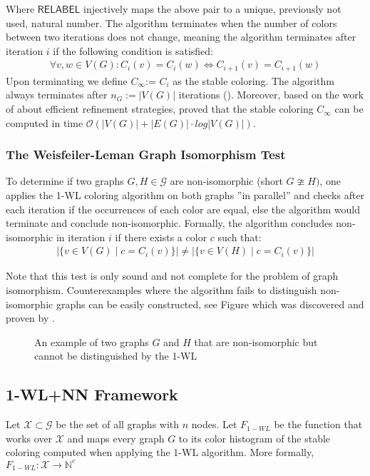 \documentclass[11pt, dvipsnames, DIV=12]{scrreprt}
\theoremstyle{definition}
\begin{document}
\noindent Where $\textsf{RELABEL}$ injectively maps the above pair to a unique, previously not used, natural number. The algorithm terminates when the number of colors between two iterations does not change, meaning the algorithm terminates after iteration $i$ if the following condition is satisfied:
\begin{align}
\forall v,w \in V(G):  C_i(v) = C_i(w) \iff C_{i+1}(v) = C_{i+1}(w)
\end{align}
Upon terminating we define $C_{\infty}$:= $C_i$ as the stable coloring. The algorithm always terminates after $n_G:= |V(G)|$ iterations (\cite{Gro2017}). Moreover, based on the work of \cite{Pai+87} about efficient refinement strategies, \cite{Car+82} proved that the stable coloring $C_\infty$ can be computed in time $\mathcal{O}(| V(G) | + |E(G)| \cdot log | V(G) |)$.

\subsubsection{The Weisfeiler-Leman Graph Isomorphism Test}
To determine if two graphs $G, H \in \mathcal{G}$ are non-isomorphic (short $G \ncong H)$, one applies the 1-WL coloring algorithm on both graphs ''in parallel'' and checks after each iteration if the occurrences of each color are equal, else the algorithm would terminate and conclude non-isomorphic. Formally, the algorithm concludes non-isomorphic in iteration $i$ if there exists a color $c$ such that: 
\begin{align}
    |\{ v \in V(G) \mid c = C_i(v)\} | \neq |\{ v \in V(H) \mid c = C_i(v)\} |
\end{align}

Note that this test is only sound and not complete for the problem of graph isomorphism. Counterexamples where the algorithm fails to distinguish non-isomorphic graphs can be easily constructed, see Figure  which was discovered and proven by \cite{Cai1992}.

\begin{figure}[H]
    \centering
    
    \caption{An example of two graphs $G$ and $H$ that are non-isomorphic but cannot be distinguished by the 1-WL}
    \label{1-WL Counter Example}
\end{figure}

\subsection{1-WL+NN Framework}\label{sec:1-WL+NN Definition}
Let $\mathcal{X} \subset \mathcal{G}$ be the set of all graphs with $n$ nodes. Let $F_{1-WL}$ be the function that works over $\mathcal{X}$ and maps every graph $G$ to its color histogram of the stable coloring computed when applying the 1-WL algorithm. More formally, $F_{1-WL}: \mathcal{X} \rightarrow \mathbb{N}^c$
\end{document}
